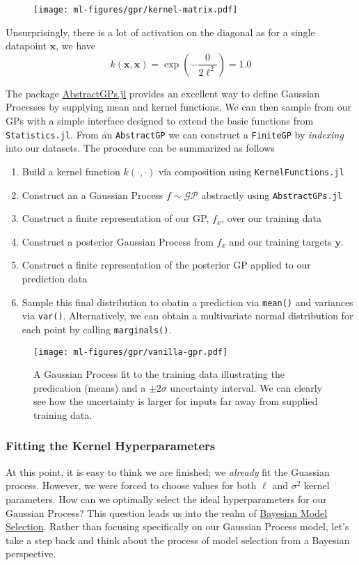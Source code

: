 \begin{figure}
  \centering
  \texttt{[image: ml-figures/gpr/kernel-matrix.pdf]}
\end{figure}
Unsurprisingly, there is a lot of activation on the diagonal as for a single datapoint $\mathbf{x}$, we have
\begin{equation}
    k(\mathbf{x},\mathbf{x}) = \exp\left(-\frac{0}{2\ell^2} \right) = 1.0
\end{equation}

The package \href{https://juliagaussianprocesses.github.io/AbstractGPs.jl/dev/}{AbstractGPs.jl} provides an excellent way to define Gaussian Processes by supplying mean and kernel functions. We can then sample from our GPs with a simple interface designed to extend the basic functions from \texttt{Statistics.jl}. From an \texttt{AbstractGP} we can construct a \texttt{FiniteGP} by \textit{indexing} into our datasets. The procedure can be summarized as follows
\begin{enumerate}
\item Build a kernel function $k(\cdot, \cdot)$ via composition using \texttt{KernelFunctions.jl}
\item Construct an a Gaussian Process $f\sim\mathcal{GP}$ abstractly using \texttt{AbstractGPs.jl}
\item Construct a finite representation of our GP, $f_x$, over our training data
\item Construct a posterior Gaussian Process from $f_x$ and our training targets $\mathbf{y}$.
\item Construct a finite representation of the posterior GP applied to our prediction data
\item Sample this final distribution to obatin a prediction via \texttt{mean()} and variances via \texttt{var()}. Alternatively, we can obtain a multivariate normal distribution for each point by calling \texttt{marginals()}.
\end{enumerate}

\begin{figure}[h]
  \centering
  \texttt{[image: ml-figures/gpr/vanilla-gpr.pdf]}
  \caption{A Gaussian Process fit to the training data illustrating the predication (means) and a $\pm 2\sigma$ uncertainty interval. We can clearly see how the uncertainty is larger for inputs far away from supplied training data.}
  \label{fig:vanilla-gpr}
\end{figure}

\subsubsection{Fitting the Kernel Hyperparameters}
At this point, it is easy to think we are finished; we \textit{already} fit the Guassian process. However, we were forced to choose values for both $\ell$ and $\sigma^2$ kernel parameters. How can we optimally select the ideal hyperparameters for our Gaussian Process? This question leads us into the realm of \href{https://gaussianprocess.org/gpml/chapters/RW5.pdf}{Bayesian Model Selection}. Rather than focusing specifically on our Gaussian Process model, let's take a step back and think about the process of model selection from a Bayesian perspective.

